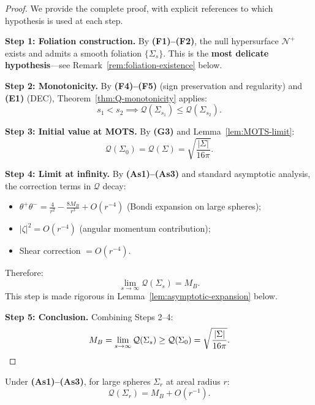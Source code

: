 \begin{proof}
We provide the complete proof, with explicit references to which hypothesis is used at each step.

\textbf{Step 1: Foliation construction.}
By \textbf{(F1)--(F2)}, the null hypersurface $\mathcal{N}^+$ exists and admits a smooth foliation $\{\Sigma_s\}$. This is the \textbf{most delicate hypothesis}---see Remark~\ref{rem:foliation-existence} below.

\textbf{Step 2: Monotonicity.}
By \textbf{(F4)--(F5)} (sign preservation and regularity) and \textbf{(E1)} (DEC), Theorem~\ref{thm:Q-monotonicity} applies:
\begin{equation}
s_1 < s_2 \implies \mathcal{Q}(\Sigma_{s_1}) \leq \mathcal{Q}(\Sigma_{s_2}).
\end{equation}

\textbf{Step 3: Initial value at MOTS.}
By \textbf{(G3)} and Lemma~\ref{lem:MOTS-limit}:
\begin{equation}
\mathcal{Q}(\Sigma_0) = \mathcal{Q}(\Sigma) = \sqrt{\frac{|\Sigma|}{16\pi}}.
\end{equation}

\textbf{Step 4: Limit at infinity.}
By \textbf{(As1)--(As3)} and standard asymptotic analysis, the correction terms in $\mathcal{Q}$ decay:
\begin{itemize}
\item $\theta^+\theta^- = \frac{4}{r^2} - \frac{8M_B}{r^3} + O(r^{-4})$ (Bondi expansion on large spheres);
\item $|\zeta|^2 = O(r^{-4})$ (angular momentum contribution);
\item Shear correction $= O(r^{-4})$.
\end{itemize}
Therefore:
\begin{equation}
\lim_{s \to \infty} \mathcal{Q}(\Sigma_s) = M_B.
\end{equation}
This step is made rigorous in Lemma~\ref{lem:asymptotic-expansion} below.

\textbf{Step 5: Conclusion.}
Combining Steps 2--4:
\begin{equation}
M_B = \lim_{s \to \infty} \mathcal{Q}(\Sigma_s) \geq \mathcal{Q}(\Sigma_0) = \sqrt{\frac{|\Sigma|}{16\pi}}. \qedhere
\end{equation}
\end{proof}

\begin{lemma}
\label{lem:asymptotic-expansion}
Under \textbf{(As1)--(As3)}, for large spheres $\Sigma_r$ at areal radius $r$:
\begin{equation}
\mathcal{Q}(\Sigma_r) = M_B + O(r^{-1}).
\end{equation}
\end{lemma}

